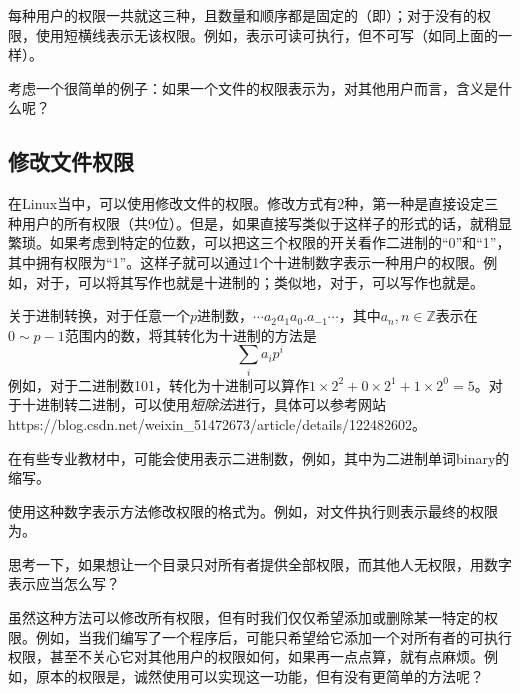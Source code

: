 \begin{attention}
    每种用户的权限一共就这三种，且数量和顺序都是固定的（即）；对于没有的权限，使用短横线\code{-}表示无该权限。例如，表示可读可执行，但不可写（如同上面的一样）。
\end{attention}

考虑一个很简单的例子：如果一个文件的权限表示为，对其他用户而言，含义是什么呢？


\subsection{修改文件权限 }\label{subsec:文件权限管理-修改文件权限}

在Linux当中，可以使用修改文件的权限。修改方式有2种，第一种是直接设定三种用户的所有权限（共9位）。但是，如果直接写类似于这样子的形式的话，就稍显繁琐。如果考虑到特定的位数，可以把这三个权限的开关看作二进制的“0”和“1”，其中拥有权限为“1”。这样子就可以通过1个十进制数字表示一种用户的权限。例如，对于，可以将其写作也就是十进制的；类似地，对于，可以写作也就是。

\begin{extend}
    关于进制转换，对于任意一个$p$进制数，$\cdots a_2a_1a_0.a_{-1}\cdots$，其中$a_n,n\in\mathbb{Z}$表示在$0\sim p-1$范围内的数，将其转化为十进制的方法是
    \begin{equation*}
        \sum_ia_ip^i
    \end{equation*}
    例如，对于二进制数101，转化为十进制可以算作$1\times2^2+0\times2^1+1\times2^0=5$。对于十进制转二进制，可以使用\emph{短除法}进行，具体可以参考网站https://blog.csdn.net/weixin\_51472673/article/details/122482602。

    在有些专业教材中，可能会使用表示二进制数，例如，其中为二进制单词binary的缩写。
\end{extend}

使用这种数字表示方法修改权限的格式为。例如，对文件执行则表示最终的权限为。

思考一下，如果想让一个目录只对所有者提供全部权限，而其他人无权限，用数字表示应当怎么写？


虽然这种方法可以修改所有权限，但有时我们仅仅希望添加或删除某一特定的权限。例如，当我们编写了一个程序后，可能只希望给它添加一个对所有者的可执行权限，甚至不关心它对其他用户的权限如何，如果再一点点算，就有点麻烦。例如，原本的权限是，诚然使用可以实现这一功能，但有没有更简单的方法呢？

